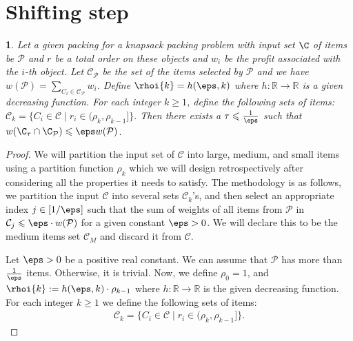 \documentclass[10pt,a4paper]{article}
\theoremstyle{plain}
\theoremstyle{plain}
\newtheorem{lem}[theorem]{\protect\lemmaname}
\theoremstyle{plain}
\theoremstyle{definition}
\providecommand{\lemmaname}{Lemma}
\begin{document}
{\section{Shifting step}\label{sec:shifting}
\begin{lem}
	\label{lem:shifting}
	Let a given packing for a knapsack packing problem with input set \(\C\) of items be $\mathcal{P}$ and \(r\) be a total order on these objects and \(w_i\) be the profit associated with the \(i\)-th object. Let $\mathcal{C}_{\mathcal{P}}$ be the set of the items selected by $\mathcal{P}$ and we have $w(\mathcal{P}) = \sum_{C_{i}\in \mathcal{C}_{\mathcal{P}}} w_{i}$. Define $\rhoi{k} = h(\eps, k)$ where $h: \mathbb{R} \rightarrow \mathbb{R}$ is a given decreasing function. For each integer \(k\geqslant 1\), define the following sets of items:
	\(
	\mathcal{C}_k = \{C_i \in \mathcal{C} \mid r_{i} \in (\rho_{k},\rho_{k-1}]\}.
	\)
	Then there exists a \(\tau \leqslant \frac{1}{\eps}\) such that \(w(\C_{\tau}\cap\C_{\mathcal{P}})\leqslant\eps w(\mathcal{P})\).
\end{lem}
\begin{proof}
We will partition the input set of $\mathcal{C}$ into large, medium, and small items using a partition function $\rho_k$ which we will design retrospectively after considering all the properties it needs to satisfy. The methodology is as follows, we partition the input $\mathcal{C}$ into several sets \(\mathcal{C}_k\)'s, and then select an appropriate index \(j \in [1/\eps]\) such that the sum of weights of all items from $\mathcal{P}$ in \( \mathcal{C}_j \leqslant \eps\cdot w(\mathcal{P})\) for a given constant $\eps>0$. We will declare this to be the medium items set $\mathcal{C}_M$ and discard it from $\mathcal{C}$.

Let $\eps>0$ be a positive real constant. We can assume that $\mathcal{P}$ has more than $\frac{1}{\eps}$ items. Otherwise, it is trivial.
Now, we define $\rho_0=1$, and $\rhoi{k} := h(\eps, k) \cdot \rho_{k-1}$ where $h: \mathbb{R} \rightarrow \mathbb{R}$ is the given decreasing function. For each integer $k \geqslant 1$ we define the following sets of items:
\begin{align*}
\mathcal{C}_k = \{C_i \in \mathcal{C} \mid r_{i} \in (\rho_{k},\rho_{k-1}]\}.
\end{align*}


\end{proof}}
\end{document}
